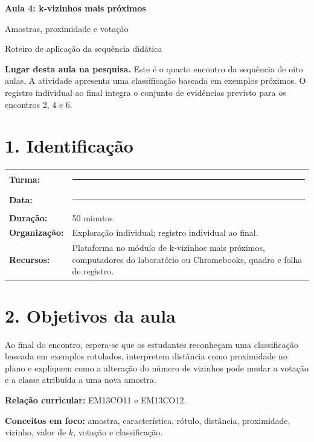 \documentclass[12pt,a4paper]{article}
\newcommand{\bloco}[1]{%
  \vspace{0.25em}
  \noindent\colorbox{cinza}{\parbox{0.96\linewidth}{#1}}%
  \vspace{0.3em}
}
\begin{document}
\begin{center}
  {\LARGE\bfseries\color{azul} Aula 4: k-vizinhos mais próximos}\par
  \vspace{0.25em}
  {\large Amostras, proximidade e votação}\par
  \vspace{0.35em}
  {\small Roteiro de aplicação da sequência didática}\par
\end{center}

\bloco{\textbf{Lugar desta aula na pesquisa.} Este é o quarto encontro da sequência de oito aulas. A atividade apresenta uma classificação baseada em exemplos próximos. O registro individual ao final integra o conjunto de evidências previsto para os encontros 2, 4 e 6.}

\section*{1. Identificação}

\begin{tabularx}{\linewidth}{@{}>{\bfseries}p{4.1cm}X@{}}
Turma: & \rule{8.5cm}{0.35pt} \\
Data: & \rule{8.5cm}{0.35pt} \\
Duração: & 50 minutos \\
Organização: & Exploração individual; registro individual ao final. \\
Recursos: & Plataforma no módulo de k-vizinhos mais próximos, computadores do laboratório ou Chromebooks, quadro e folha de registro. \\
\end{tabularx}

\section*{2. Objetivos da aula}

Ao final do encontro, espera-se que os estudantes reconheçam uma classificação baseada em exemplos rotulados, interpretem distância como proximidade no plano e expliquem como a alteração do número de vizinhos pode mudar a votação e a classe atribuída a uma nova amostra.

\textbf{Relação curricular:} EM13CO11 e EM13CO12.

\textbf{Conceitos em foco:} amostra, característica, rótulo, distância, proximidade, vizinho, valor de $k$, votação e classificação.
\end{document}
